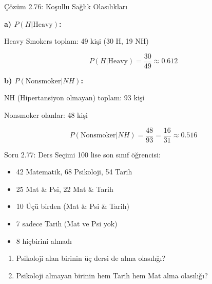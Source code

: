 \documentclass[light]{lutbeamer}
\begin{document}
\begin{frame}{Çözüm 2.76: Koşullu Sağlık Olasılıkları}
    \color{blue}
    
    \textbf{a) $P(H | \text{Heavy})$:}
    
    Heavy Smokers toplam: 49 kişi (30 H, 19 NH)
    
    \[ P(H | \text{Heavy}) = \frac{30}{49} \approx 0.612 \]
    
    \vspace{0.5cm}
    \textbf{b) $P(\text{Nonsmoker} | NH)$:}
    
    NH (Hipertansiyon olmayan) toplam: 93 kişi
    
    Nonsmoker olanlar: 48 kişi
    
    \[ P(\text{Nonsmoker} | NH) = \frac{48}{93} = \frac{16}{31} \approx 0.516 \]
    
    \begin{center}
    \end{center}
\end{frame}

\begin{frame}{Soru 2.77: Ders Seçimi}
    \small
    100 lise son sınıf öğrencisi:
    \begin{itemize}
        \item 42 Matematik, 68 Psikoloji, 54 Tarih
        \item 25 Mat \& Psi, 22 Mat \& Tarih
        \item 10 Üçü birden (Mat \& Psi \& Tarih)
        \item 7 sadece Tarih (Mat ve Psi yok)
        \item 8 hiçbirini almadı
    \end{itemize}
    
    \begin{enumerate}
        \item Psikoloji alan birinin üç dersi de alma olasılığı?
        \item Psikoloji almayan birinin hem Tarih hem Mat alma olasılığı?
    \end{enumerate}
\end{frame}
\end{document}
